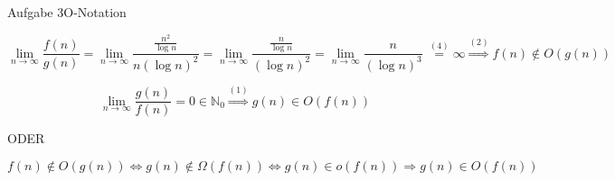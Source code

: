 \begin{frame}[allowframebreaks]{Aufgabe 3}{O-Notation}
  \begin{solutionnoinc}
    \begin{dmath*}[compact]
      \operatorname*{lim}_{n\to\infty}{\frac{f(n)}{g(n)}}
      =\operatorname*{lim}_{n\to\infty}{\frac{{\frac{n^{2}}{\log n}}}{n(\log n)^{2}}}
      =\operatorname*{lim}_{n\to\infty}{\frac{{\frac{n}{\log n}}}{(\log n)^{2}}}
      =\operatorname*{lim}_{n\to\infty}{\frac{n}{(\log n)^{3}}}\ {\overset{(4)}{=}}\infty
      \stackrel{(2)}{\Rightarrow}f(n)\notin O(g(n))
    \end{dmath*}
  \end{solutionnoinc}
  \begin{solution}
    \begin{dmath*}[compact]
      \operatorname*{lim}_{n\to\infty}{\frac{g(n)}{f(n)}}
      =0\in\mathbb{N}_{0}
      \stackrel{\left(1\right)}{\Rightarrow}g(n)\in O(f(n))
    \end{dmath*}
    \vspace{-0.3cm}
    \begin{center}
      ODER
    \end{center}
    \begin{dmath*}[compact]
      f(n)\not\in O(g(n)) \Leftrightarrow g(n)\not\in\Omega(f(n)) \Leftrightarrow g(n)\in o(f(n)) \Rightarrow g(n)\in O(f(n))
    \end{dmath*}
  \end{solution}
\end{frame}
